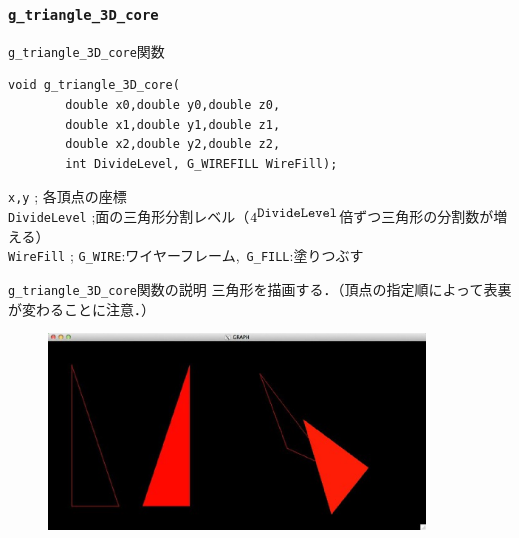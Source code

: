 \documentclass[a4paper,12pt]{jsarticle}%
\begin{document}


\clearpage
\subsubsection{\texttt{g\_triangle\_3D\_core}}

\begin{itembox}[l]{\texttt{g\_triangle\_3D\_core}関数}
\begin{verbatim}
void g_triangle_3D_core(
        double x0,double y0,double z0,
        double x1,double y1,double z1,
        double x2,double y2,double z2,
        int DivideLevel, G_WIREFILL WireFill);    
\end{verbatim}
\verb|x,y| ; 各頂点の座標\\
\verb|DivideLevel| ;面の三角形分割レベル（$4^{\verb|DivideLevel|}$倍ずつ三角形の分割数が増える）\\
\verb|WireFill| ; \verb|G_WIRE|:ワイヤーフレーム,\ \verb|G_FILL|:塗りつぶす \\
\end{itembox}

\begin{itembox}[l]{\texttt{g\_triangle\_3D\_core}関数の説明}
三角形を描画する．（頂点の指定順によって表裏が変わることに注意．）
\end{itembox}

\begin{figure}[htb]
	\includegraphics[width=100mm]{./Figures/eps/Canvas_g_triangle.eps}
\end{figure}
\end{document}
